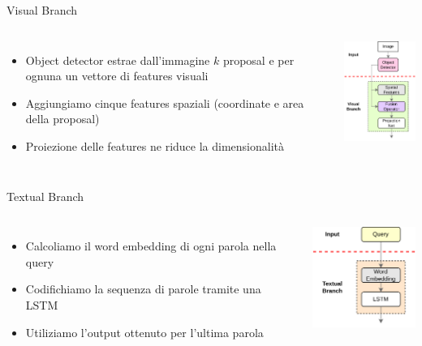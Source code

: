 \documentclass{beamer}
\begin{document}
\begin{frame}{Visual Branch}
  \begin{columns}
      \begin{itemize}
        \item Object detector estrae dall'immagine $k$ proposal e per
        ognuna un vettore di \alert{features visuali}
        \item Aggiungiamo cinque \alert{features spaziali} (coordinate e
        area della proposal)
        \item \alert{Proiezione} delle features ne riduce la dimensionalità
      \end{itemize}
      \centering
      \includegraphics[width=3.5cm]{images/visual-branch.png}
  \end{columns}
\end{frame}

\begin{frame}{Textual Branch}
  \begin{columns}
      \begin{itemize}
        \item Calcoliamo il \alert{word embedding} di ogni parola nella query
        \item Codifichiamo la \alert{sequenza} di parole tramite una LSTM
        \item Utiliziamo l'output ottenuto per \alert{l'ultima} parola
      \end{itemize}
      \centering
      \includegraphics[width=3.5cm]{images/textual-branch.png}
  \end{columns}
\end{frame}
\end{document}
